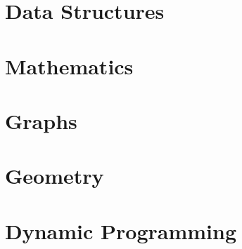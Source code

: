 \documentclass[landscape,twocolumn, 7pt, letterpaper]{book}
\begin{document}
\chapter{Data Structures}




\chapter{Mathematics}


\chapter{Graphs}



\chapter{Geometry}


\chapter{Dynamic Programming}

\end{document}
